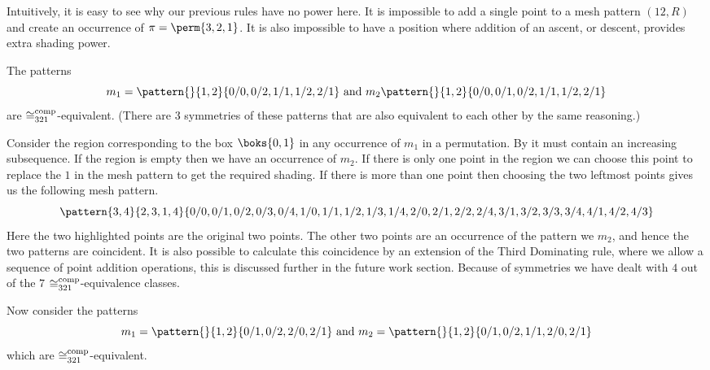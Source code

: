 Intuitively, it is easy to see why our previous rules have no power here. It is
impossible to add a single point to a mesh pattern \((12, R)\) and create an
occurrence of \(\pi = \perm{3,2,1}\). It is also impossible to have a position
where addition of an ascent, or descent, provides extra shading power.

The patterns
\begin{equation*}
    m_1 = \pattern{}{1,2}{0/0, 0/2, 1/1, 1/2, 2/1} \et m_2 \pattern{}{1,2}{0/0,
    0/1, 0/2, 1/1, 1/2, 2/1}
\end{equation*}
are \(\coinc[comp]{321}\)-equivalent. (There are 3 symmetries of these
patterns that are also equivalent to each other by the same reasoning.)

Consider the region corresponding to the box \(\boks{0,1}\) in any occurrence of
\(m_1\) in a permutation. By  it must contain an increasing
subsequence. If the region is empty then we have an occurrence of \(m_2\). If
there is only one point in the region we can choose this point to replace the
\(1\) in the mesh pattern to get the required shading. If there is more than one
point then choosing the two leftmost points gives us the following mesh pattern.
\begin{equation*}
    \pattern{3,4}{2,3,1,4}{0/0, 0/1, 0/2, 0/3, 0/4,
                            1/0, 1/1, 1/2, 1/3, 1/4,
                            2/0, 2/1,2/2, 2/4,
                            3/1, 3/2, 3/3, 3/4,
                            4/1, 4/2, 4/3}
\end{equation*}
Here the two highlighted points are the original two points. The other two
points are an occurrence of the pattern we \(m_2\), and hence the two patterns
are coincident. It is also possible to calculate this coincidence by an
extension of the Third Dominating rule, where we allow a sequence of point
addition operations, this is discussed further in the future work section.
Because of symmetries we have dealt with \(4\) out of the \(7\)
\(\coinc[comp]{321}\)-equivalence classes.

Now consider the patterns
\begin{equation*}
    m_1 = \pattern{}{1,2}{0/1,0/2,2/0,2/1} \text{ and } m_2 = \pattern{}{1,2}{0/1,0/2,1/1,2/0,2/1}
\end{equation*}
which are \(\coinc[comp]{321}\)-equivalent.

